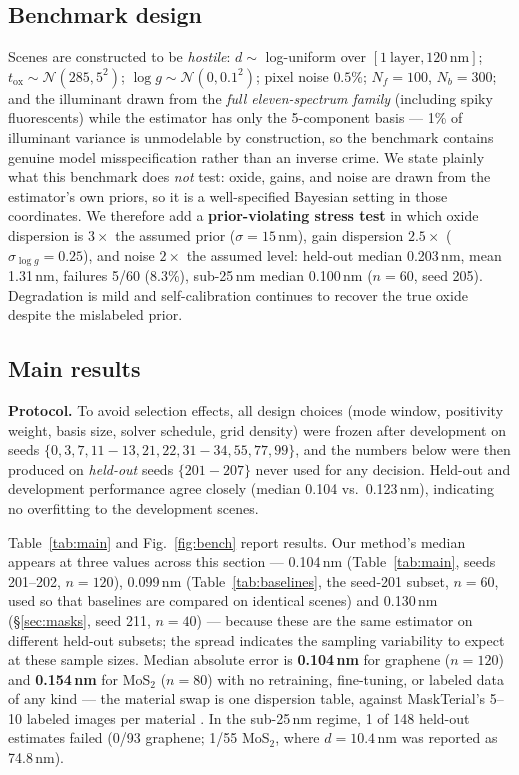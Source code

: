 \documentclass[10pt]{article}
\begin{document}
\subsection{Benchmark design}
Scenes are constructed to be \emph{hostile}: $d\sim$ log-uniform over $[1\ \mathrm{layer},120\,\mathrm{nm}]$; $t_{\mathrm{ox}}\sim\mathcal{N}(285,5^2)$; $\log g\sim\mathcal{N}(0,0.1^2)$; pixel noise $0.5\%$; $N_f{=}100$, $N_b{=}300$; and the illuminant drawn from the \emph{full eleven-spectrum family} (including spiky fluorescents) while the estimator has only the 5-component basis --- 1\% of illuminant variance is unmodelable by construction, so the benchmark contains genuine model misspecification rather than an inverse crime. We state plainly what this benchmark does \emph{not} test: oxide, gains, and noise are drawn from the estimator's own priors, so it is a well-specified Bayesian setting in those coordinates. We therefore add a \textbf{prior-violating stress test} in which oxide dispersion is $3\times$ the assumed prior ($\sigma{=}15$\,nm), gain dispersion $2.5\times$ ($\sigma_{\log g}{=}0.25$), and noise $2\times$ the assumed level: held-out median 0.203\,nm, mean 1.31\,nm, failures 5/60 (8.3\%), sub-25\,nm median 0.100\,nm ($n{=}60$, seed 205). Degradation is mild and self-calibration continues to recover the true oxide despite the mislabeled prior.

\subsection{Main results}
\textbf{Protocol.} To avoid selection effects, all design choices (mode window, positivity weight, basis size, solver schedule, grid density) were frozen after development on seeds $\{0,3,7,11\!-\!13,21,22,31\!-\!34,55,77,99\}$, and the numbers below were then produced on \emph{held-out} seeds $\{201\!-\!207\}$ never used for any decision. Held-out and development performance agree closely (median 0.104 vs.\ 0.123\,nm), indicating no overfitting to the development scenes.

Table~\ref{tab:main} and Fig.~\ref{fig:bench} report results. Our method's median appears at three values across this section --- 0.104\,nm (Table~\ref{tab:main}, seeds 201--202, $n{=}120$), 0.099\,nm (Table~\ref{tab:baselines}, the seed-201 subset, $n{=}60$, used so that baselines are compared on identical scenes) and 0.130\,nm (\S\ref{sec:masks}, seed 211, $n{=}40$) --- because these are the same estimator on different held-out subsets; the spread indicates the sampling variability to expect at these sample sizes. Median absolute error is \textbf{0.104\,nm} for graphene ($n{=}120$) and \textbf{0.154\,nm} for MoS$_2$ ($n{=}80$) with no retraining, fine-tuning, or labeled data of any kind --- the material swap is one dispersion table, against MaskTerial's 5--10 labeled images per material \cite{uslu2024maskterial}. In the sub-25\,nm regime, 1 of 148 held-out estimates failed (0/93 graphene; 1/55 MoS$_2$, where $d{=}10.4$\,nm was reported as 74.8\,nm).
\end{document}

